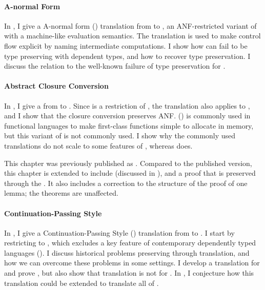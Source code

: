 \paragraph{A-normal Form}
In , I give a  A-normal form
() translation from \slang to \anftlang, an ANF-restricted variant
of \slang with a machine-like evaluation semantics.
The  translation is used to make control flow explicit by naming
intermediate computations.
I show how  can fail to be type preserving with dependent types, and
how to recover type preservation.
I discuss the relation to the well-known failure of type preservation for
.

\paragraph{Abstract Closure Conversion}
In , I give a 
 from \slang to \abscctlang.
Since \anftlang is a restriction of \slang, the translation also applies to
\anftlang, and I show that the closure conversion preserves ANF.
 () is commonly used in functional
languages to make first-class functions simple to allocate in memory, but this
variant of   is not commonly
used.
I show why the commonly used  translations do not scale
to some features of , whereas  does.

This chapter was previously published as \citet{bowman2018:cccc}.
Compared to the published version, this chapter is extended to include
 (discussed in ), and a proof
that  is preserved through the .
It also includes a correction to the structure of the proof of one lemma; the
theorems are unaffected.

\paragraph{Continuation-Passing Style}
In , I give a  Continuation-Passing
Style () translation from \cpsslang to \cpstlang.
I start by restricting \slang to \cpsslang, which excludes a key feature of
contemporary dependently typed languages ().
I discuss historical problems preserving  through
 translation, and how we can overcome these problems in some settings.
I develop a   translation for \cpsslang and
prove , but also show that translation is not
 for \slang.
In , I conjecture how this translation could be
extended to translate all of \slang.

